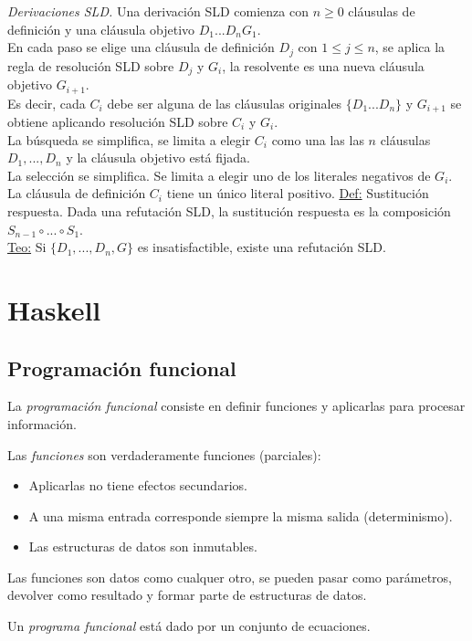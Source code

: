\documentclass[12pt]{extarticle}
\def\definicion{\newline\underline{Def:} }
\def\teorema{\underline{Teo:} }
\begin{document}
\textit{Derivaciones SLD.} Una derivación SLD comienza con $n \geq 0$ cláusulas de definición y una cláusula objetivo $D_1 ... D_n G_1$. \\
En cada paso se elige una cláusula de definición $D_j$ con $1\leq j\leq n$, se aplica la regla de resolución SLD sobre $D_j$ y $G_i$, la resolvente es una nueva cláusula objetivo $G_{i+1}$. \\
Es decir, cada $C_i$ debe ser alguna de las cláusulas originales $\{D_1 ... D_n\}$ y $G_{i+1}$ se obtiene aplicando resolución SLD sobre $C_i$ y $G_i$. \\
La búsqueda se simplifica, se limita a elegir $C_i$ como una las las $n$ cláusulas $D_1,...,D_n$ y la cláusula objetivo está fijada. \\
La selección se simplifica. Se limita a elegir uno de los literales negativos de $G_i$. La cláusula de definición $C_i$ tiene un único literal positivo.
\definicion Sustitución respuesta. Dada una refutación SLD, la sustitución respuesta es la composición $S_{n-1}\circ...\circ S_1$. \\
\teorema Si $\{D_1,...,D_n,G\}$ es insatisfactible, existe una refutación SLD.

\section{Haskell}

\subsection{Programación funcional}
La \textit{programación funcional} consiste en definir funciones y aplicarlas para procesar información.

Las \textit{funciones} son verdaderamente funciones (parciales):
\begin{itemize}
\itemsep-0.35em 
\item Aplicarlas no tiene efectos secundarios.
\item A una misma entrada corresponde siempre la misma salida (determinismo).
\item Las estructuras de datos son inmutables.
\end{itemize}

Las funciones son datos como cualquer otro, se pueden pasar como parámetros, devolver como resultado y formar parte de estructuras de datos.

Un \textit{programa funcional} está dado por un conjunto de ecuaciones.
\end{document}
